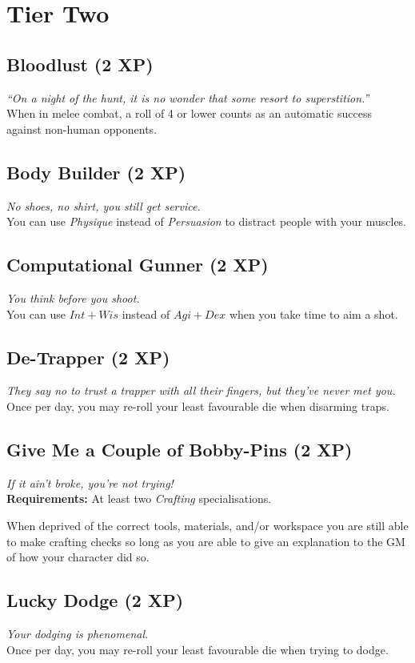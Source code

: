 \section{Tier Two}

\subsection{Bloodlust (2 XP)}
\textit{``On a night of the hunt, it is no wonder that some resort to superstition.''}\\
When in melee combat, a roll of 4 or lower counts as an automatic success against non-human opponents.

\subsection{Body Builder (2 XP)}
\textit{No shoes, no shirt, you still get service.}\\
You can use \textit{Physique} instead of \textit{Persuasion} to distract people with your muscles.

\subsection{Computational Gunner (2 XP)}
\textit{You think before you shoot.}\\
You can use $Int+Wis$ instead of $Agi+Dex$ when you take time to aim a shot.

\subsection{De-Trapper (2 XP)}
\textit{They say no to trust a trapper with all their fingers, but they've never met you.}\\
Once per day, you may re-roll your least favourable die when disarming traps.

\subsection{Give Me a Couple of Bobby-Pins (2 XP)}
\textit{If it ain't broke, you're not trying!}\\
\textbf{Requirements:} At least two \textit{Crafting} specialisations.

When deprived of the correct tools, materials, and/or workspace you are still able to make crafting checks so long as you are able to give an explanation to the GM of how your character did so.

\subsection{Lucky Dodge (2 XP)}
\textit{Your dodging is phenomenal.}\\
Once per day, you may re-roll your least favourable die when trying to dodge.

